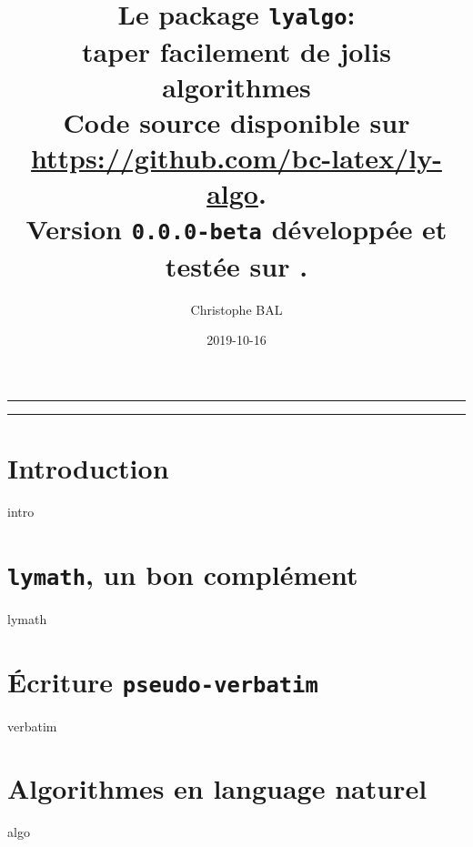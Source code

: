 \documentclass[12pt,a4paper]{article}
\begin{document}
\title{%
	Le package \texttt{lyalgo}:
	\\
	taper facilement de jolis algorithmes
	\\
	{
		\footnotesize Code source disponible
		sur \url{https://github.com/bc-latex/ly-algo}.%
	}
	\\
	{
		\footnotesize Version \texttt{0.0.0-beta}
		développée et testée sur \macosxname{}.%
	}
}

\author{Christophe BAL}
\date{2019-10-16}

\maketitle


\vspace{2em}

\hrule

\tableofcontents

\vspace{1.5em}

\hrule

\newpage





\section{Introduction}

{intro}




\section{\texttt{lymath}, un bon complément}

{lymath}




\section{Écriture \texttt{pseudo-verbatim}}

{verbatim}




\section{Algorithmes en language naturel}

{algo}




%
\end{document}
